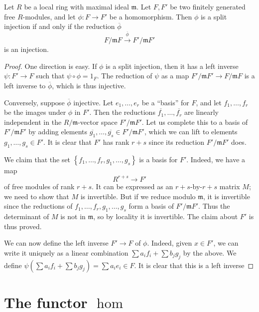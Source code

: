 \begin{proposition} 
Let $R$ be a local ring with maximal ideal $\mathfrak{m}$. Let $F, F'$ be two
finitely generated free $R$-modules, and let $\phi: F \to F'$ be a homomorphism. 
Then $\phi$ is a split injection if and only if the reduction $\overline{\phi}$
\[ F/\mathfrak{m}F \stackrel{\overline{\phi}}{\to} F'/\mathfrak{m}F'  \]
is an injection. 
\end{proposition}
\begin{proof} 
One direction is easy. If $\phi$ is a split injection, then it has a left
inverse
$\psi: F' \to F$ such that $\psi \circ \phi = 1_F$. The reduction of $\psi$ as a
map $F'/\mathfrak{m}F' \to F/\mathfrak{m}F$ is a left inverse to
$\overline{\phi}$, which is thus injective.

Conversely, suppose $\overline{\phi}$ injective. Let $e_1, \dots, e_r$ be a
``basis'' for $F$, and let $f_1, \dots, f_r$ be the images under $\phi$ in
$F'$. Then the reductions $\overline{f_1}, \dots, \overline{f_r}$ are linearly
independent in the $R/\mathfrak{m}$-vector space $F'/\mathfrak{m}F'$. Let us
complete this to a basis of $F'/\mathfrak{m}F'$ by adding elements
$\overline{g_1}, \dots, \overline{g_s} \in F'/\mathfrak{m}F'$, which we can
lift to elements $g_1, \dots, g_s \in F'$. It is clear that $F'$ has rank $r+s $
since its reduction $F'/\mathfrak{m}F'$ does.

We claim that the set $\left\{f_1, \dots, f_r, g_1, \dots, g_s\right\}$ is a
basis for $F'$. Indeed, we have a map 
\[ R^{r+s} \to F'  \]
of free modules of rank $r+s$. It can be expressed as an $r+s$-by-$r+s$ matrix
$M$; we need to show that $M$ is invertible. But if we reduce modulo
$\mathfrak{m}$, it is invertible since the reductions of $f_1, \dots, f_r,
g_1, \dots, g_s$ form a basis of $F'/\mathfrak{m}F'$. 
Thus the determinant of $M$ is not in $\mathfrak{m}$, so by locality it is
invertible. 
The claim about $F'$ is thus proved.

We can now define the left inverse $F' \to F$ of $\phi$. Indeed, given $x \in F'$,
we can write it uniquely as a linear combination $\sum a_i f_i + \sum b_j g_j$
by the above. We define $\psi(\sum a_i f_i + \sum b_j g_j) = \sum a_i e_i \in
F$. It is clear that this is a left inverse
\end{proof} 


\section{The functor $\hom$}

